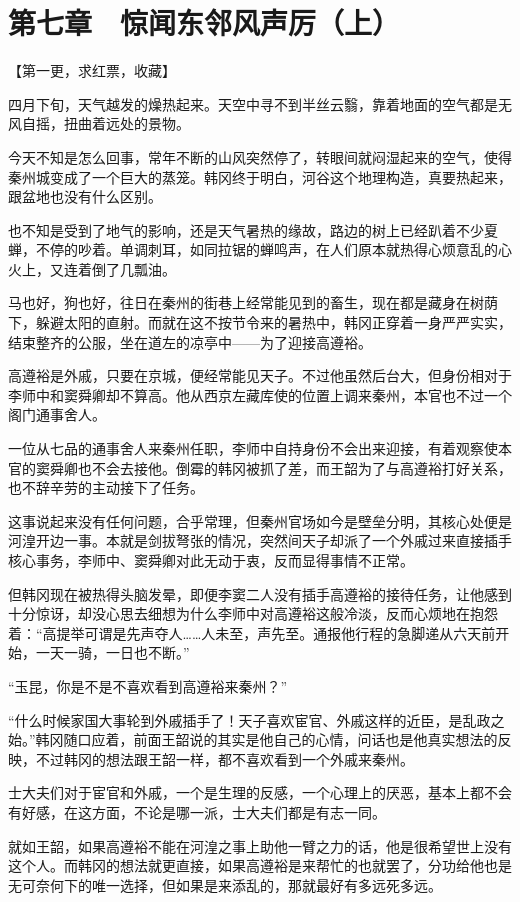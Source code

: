 \section{第七章　惊闻东邻风声厉（上）}

【第一更，求红票，收藏】

四月下旬，天气越发的燥热起来。天空中寻不到半丝云翳，靠着地面的空气都是无风自摇，扭曲着远处的景物。

今天不知是怎么回事，常年不断的山风突然停了，转眼间就闷湿起来的空气，使得秦州城变成了一个巨大的蒸笼。韩冈终于明白，河谷这个地理构造，真要热起来，跟盆地也没有什么区别。

也不知是受到了地气的影响，还是天气暑热的缘故，路边的树上已经趴着不少夏蝉，不停的吵着。单调刺耳，如同拉锯的蝉鸣声，在人们原本就热得心烦意乱的心火上，又连着倒了几瓢油。

马也好，狗也好，往日在秦州的街巷上经常能见到的畜生，现在都是藏身在树荫下，躲避太阳的直射。而就在这不按节令来的暑热中，韩冈正穿着一身严严实实，结束整齐的公服，坐在道左的凉亭中——为了迎接高遵裕。

高遵裕是外戚，只要在京城，便经常能见天子。不过他虽然后台大，但身份相对于李师中和窦舜卿却不算高。他从西京左藏库使的位置上调来秦州，本官也不过一个阁门通事舍人。

一位从七品的通事舍人来秦州任职，李师中自持身份不会出来迎接，有着观察使本官的窦舜卿也不会去接他。倒霉的韩冈被抓了差，而王韶为了与高遵裕打好关系，也不辞辛劳的主动接下了任务。

这事说起来没有任何问题，合乎常理，但秦州官场如今是壁垒分明，其核心处便是河湟开边一事。本就是剑拔弩张的情况，突然间天子却派了一个外戚过来直接插手核心事务，李师中、窦舜卿对此无动于衷，反而显得事情不正常。

但韩冈现在被热得头脑发晕，即便李窦二人没有插手高遵裕的接待任务，让他感到十分惊讶，却没心思去细想为什么李师中对高遵裕这般冷淡，反而心烦地在抱怨着：“高提举可谓是先声夺人……人未至，声先至。通报他行程的急脚递从六天前开始，一天一骑，一日也不断。”

“玉昆，你是不是不喜欢看到高遵裕来秦州？”

“什么时候家国大事轮到外戚插手了！天子喜欢宦官、外戚这样的近臣，是乱政之始。”韩冈随口应着，前面王韶说的其实是他自己的心情，问话也是他真实想法的反映，不过韩冈的想法跟王韶一样，都不喜欢看到一个外戚来秦州。

士大夫们对于宦官和外戚，一个是生理的反感，一个心理上的厌恶，基本上都不会有好感，在这方面，不论是哪一派，士大夫们都是有志一同。

就如王韶，如果高遵裕不能在河湟之事上助他一臂之力的话，他是很希望世上没有这个人。而韩冈的想法就更直接，如果高遵裕是来帮忙的也就罢了，分功给他也是无可奈何下的唯一选择，但如果是来添乱的，那就最好有多远死多远。

